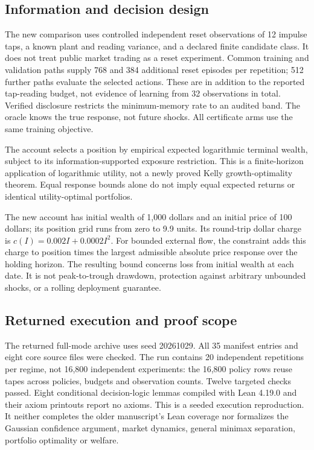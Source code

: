 \subsection*{Information and decision design}
The new comparison uses controlled independent reset observations of 12 impulse
taps, a known plant and reading variance, and a declared finite candidate class.
It does not treat public market trading as a reset experiment. Common training
and validation paths supply 768 and 384 additional reset episodes per repetition;
512 further paths evaluate the selected actions. These are in addition to the
reported tap-reading budget, not evidence of learning from 32 observations in
total. Verified disclosure restricts
the minimum-memory rate to an audited band. The oracle knows the true response,
not future shocks. All certificate arms use the same training objective.

The account selects a position by empirical expected logarithmic terminal
wealth, subject to its information-supported exposure restriction. This is a
finite-horizon application of logarithmic utility, not a newly proved Kelly
growth-optimality theorem. Equal response bounds alone do not imply equal
expected returns or identical utility-optimal portfolios.

The new account has initial wealth of 1,000 dollars and an initial price of
100 dollars; its position grid runs from zero to 9.9 units. Its round-trip
dollar charge is $c(I)=0.002I+0.0002I^2$. For bounded external flow, the
constraint adds this charge to position times the largest admissible absolute
price response over the holding horizon. The resulting bound concerns loss
from initial wealth at each date. It is not peak-to-trough drawdown, protection
against arbitrary unbounded shocks, or a rolling deployment guarantee.

\subsection*{Returned execution and proof scope}
The returned full-mode archive uses seed 20261029. All 35 manifest entries and
eight core source files were checked. The run contains 20 independent
repetitions per regime, not 16,800 independent experiments: the 16,800 policy
rows reuse tapes across policies, budgets and observation counts. Twelve
targeted checks passed. Eight conditional decision-logic lemmas compiled with
Lean 4.19.0 and their axiom printouts report no axioms. This is a seeded
execution reproduction. It neither completes the older manuscript's Lean
coverage nor formalizes the Gaussian confidence argument, market dynamics,
general minimax separation, portfolio optimality or welfare.

